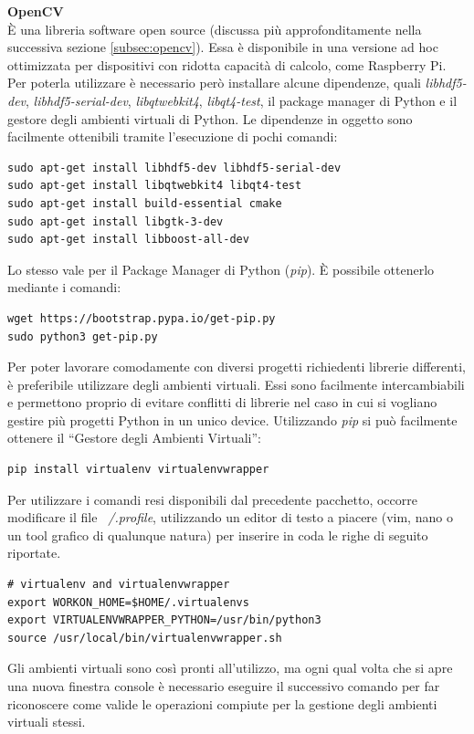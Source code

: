 \documentclass[12pt]{article}
\newcommand{\quotes}[1]{``#1''}
\begin{document}
\vspace{0.5cm}
\textbf{OpenCV}\\
È una libreria software open source (discussa più approfonditamente nella successiva sezione \ref{subsec:opencv}).
Essa è disponibile in una versione ad hoc ottimizzata per dispositivi con ridotta capacità di calcolo, come Raspberry Pi. Per poterla utilizzare è necessario però installare alcune dipendenze, quali \textit{libhdf5-dev}, \textit{libhdf5-serial-dev}, \textit{libqtwebkit4}, \textit{libqt4-test}, il package manager di Python e il gestore degli ambienti virtuali di Python. Le dipendenze in oggetto sono facilmente ottenibili tramite l'esecuzione di pochi comandi:
\begin{lstlisting}
sudo apt-get install libhdf5-dev libhdf5-serial-dev
sudo apt-get install libqtwebkit4 libqt4-test
sudo apt-get install build-essential cmake
sudo apt-get install libgtk-3-dev
sudo apt-get install libboost-all-dev
\end{lstlisting}
Lo stesso vale per il Package Manager di Python (\textit{pip}). È possibile ottenerlo mediante i comandi:
\begin{lstlisting}
wget https://bootstrap.pypa.io/get-pip.py
sudo python3 get-pip.py
\end{lstlisting}
Per poter lavorare comodamente con diversi progetti richiedenti librerie differenti, è preferibile utilizzare degli ambienti virtuali. Essi sono facilmente intercambiabili e permettono proprio di evitare conflitti di librerie nel caso in cui si vogliano gestire più progetti Python in un unico device. Utilizzando \textit{pip} si può facilmente ottenere il \quotes{Gestore degli Ambienti Virtuali}:
\begin{lstlisting}
pip install virtualenv virtualenvwrapper
\end{lstlisting}
Per utilizzare i comandi resi disponibili dal precedente pacchetto, occorre modificare il file \textit{~/.profile}, utilizzando un editor di testo a piacere (vim, nano o un tool grafico di qualunque natura) per inserire in coda le righe di seguito riportate.
\begin{lstlisting}
# virtualenv and virtualenvwrapper
export WORKON_HOME=$HOME/.virtualenvs
export VIRTUALENVWRAPPER_PYTHON=/usr/bin/python3
source /usr/local/bin/virtualenvwrapper.sh
\end{lstlisting}
Gli ambienti virtuali sono così pronti all'utilizzo, ma ogni qual volta che si apre una nuova finestra console è necessario eseguire il successivo comando per far riconoscere come valide le operazioni compiute per la gestione degli ambienti virtuali stessi.
\end{document}

